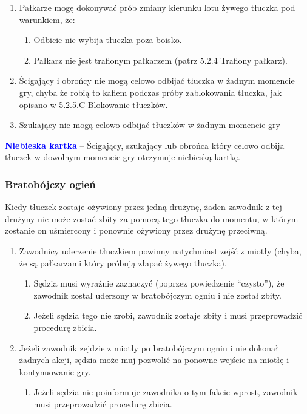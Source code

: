 \documentclass[12pt]{article}
\newcommand\bluecard[1]{\bgroup\textcolor{blue}{\textbf{#1}}}
\begin{document}
\begin{enumerate}
	\item
	      Pałkarze mogę dokonywać prób zmiany kierunku lotu żywego tłuczka pod
	      warunkiem, że:

	      \begin{enumerate}
		      \item
		            Odbicie nie wybija tłuczka poza boisko.
		      \item
		            Pałkarz nie jest trafionym pałkarzem (patrz 5.2.4 Trafiony pałkarz).
	      \end{enumerate}
	\item
	      Ścigający i obrońcy nie mogą celowo odbijać tłuczka w żadnym momencie
	      gry, chyba że robią to kaflem podczas próby zablokowania tłuczka, jak
	      opisano w 5.2.5.C Blokowanie tłuczków.
	\item
	      Szukający nie mogą celowo odbijać tłuczków w żadnym momencie gry
\end{enumerate}

\bluecard{Niebieska kartka} -- Ścigający, szukający lub obrońca który celowo
odbija tłuczek w dowolnym momencie gry otrzymuje niebieską kartkę.

\subsubsection{Bratobójczy ogień}

Kiedy tłuczek zostaje ożywiony przez jedną drużynę, żaden zawodnik z tej
drużyny nie może zostać zbity za pomocą tego tłuczka do momentu, w
którym zostanie on uśmiercony i ponownie ożywiony przez drużynę
przeciwną.

\begin{enumerate}
	\item
	      Zawodnicy uderzenie tłuczkiem powinny natychmiast zejść z miotły
	      (chyba, że są pałkarzami który próbują złapać żywego tłuczka).

	      \begin{enumerate}
		      \item
		            Sędzia musi wyraźnie zaznaczyć (poprzez powiedzenie ``czysto''), że
		            zawodnik został uderzony w bratobójczym ogniu i nie został zbity.
		      \item
		            Jeżeli sędzia tego nie zrobi, zawodnik zostaje zbity i musi
		            przeprowadzić procedurę zbicia.
	      \end{enumerate}
	\item
	      Jeżeli zawodnik zejdzie z miotły po bratobójczym ogniu i nie dokonał
	      żadnych akcji, sędzia może muj pozwolić na ponowne wejście na miotłę i
	      kontynuowanie gry.

	      \begin{enumerate}
		      \item
		            Jeżeli sędzia nie poinformuje zawodnika o tym fakcie wprost,
		            zawodnik musi przeprowadzić procedurę zbicia.
	      \end{enumerate}
\end{enumerate}
\end{document}

